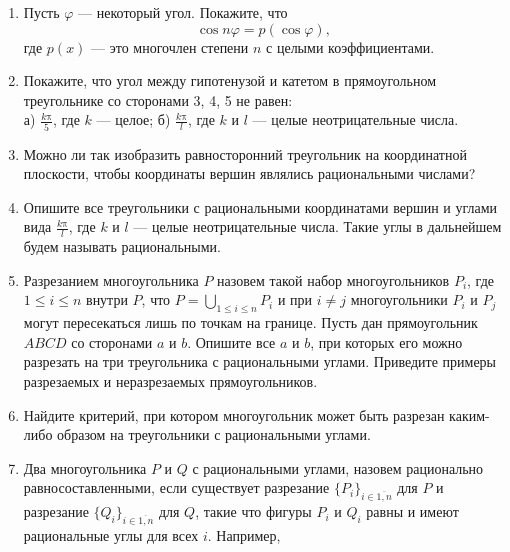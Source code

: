 \begin{enumerate}
\item Пусть $\varphi$ --- некоторый угол. Покажите, что 
$$\cos n\varphi=p(\cos\varphi),$$
где $p(x)$ --- это многочлен степени $n$ с целыми коэффициентами.
\item Покажите, что угол между гипотенузой и катетом в прямоугольном треугольнике со сторонами 3, 4, 5 не равен:\\
а) $\tfrac{k\text{π}}{5}$, где $k$ --- целое;    б) $\tfrac{k\text{π}}{l}$, где $k$ и $l$ --- целые неотрицательные числа.
\item Можно ли так изобразить равносторонний треугольник на координатной плоскости, чтобы координаты вершин являлись рациональными числами?
\item Опишите все треугольники с рациональными координатами вершин и углами вида $\tfrac{k\text{π}}{l}$, где $k$ и $l$ --- целые неотрицательные числа. Такие углы в дальнейшем будем называть рациональными.
\item Разрезанием многоугольника $P$ назовем такой набор многоугольников $P_i$, где $1\leq i\leq n$ внутри $P$, что $P=\bigcup_{1\leq i\leq n} P_i$ и при $i\neq j$ многоугольники $P_i$ и $P_j$ могут пересекаться лишь по точкам на границе.
Пусть дан прямоугольник $ABCD$ со сторонами $a$ и $b$. Опишите все $a$ и $b$, при которых его можно разрезать на три треугольника с рациональными углами. Приведите примеры разрезаемых и неразрезаемых прямоугольников.
\item Найдите критерий, при котором многоугольник может быть разрезан каким-либо образом на треугольники с рациональными углами.
\item Два многоугольника $P$ и $Q$ с рациональными углами,  назовем рационально равносоставленными, если существует разрезание $\{P_i\}_{i\in \overline{1,n}}$ для $P$ и разрезание $\{Q_i\}_{i\in \overline{1,n}}$ для $Q$, такие что фигуры $P_i$ и $Q_i$ равны и имеют рациональные углы для всех $i$. Например, 
\begin{figure}[h]
\begin{center}
\end{center}
\end{figure}
\end{enumerate}
